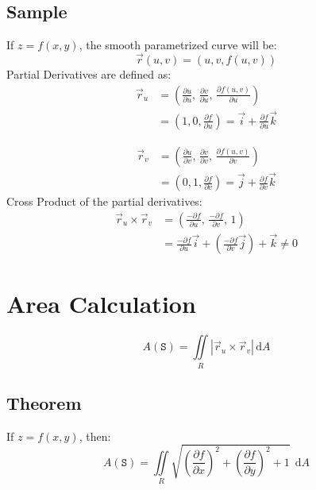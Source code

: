 \documentclass[12pt, fleqn]{book}
\newcommand{\D}{\mathrm{d}}
\newcommand{\rutrv}{\vec{r}_u \times \vec{r}_v\right}
\newcommand{\xy}{(x, y)}
\newcommand{\uv}{(u, v)}
\newcommand{\rond}[2]{\frac{\partial #1}{\partial #2}}
\begin{document}
		\subsection{Sample}
			If $z = f\xy$, the smooth parametrized curve will be:
				\begin{equation}
					\vec{r}\uv = (u, v, f\uv)
				\end{equation}
		 	Partial Derivatives are defined as:
			 	\begin{equation}
				 	\begin{split}
				 		\vec{r}_u 
				 		& = (
				 			\rond{u}{u}, \,
				 			\rond{v}{u}, \,
				 			\rond{f\uv}{u}
				 		) \\
				 		& = (1, 0, \rond{f}{u})
			              = \vec{i} + \rond{f}{u} \vec{k}
				 	\end{split}
			 	\end{equation}
		 	
			 	\begin{equation}
				 	\begin{split}
						\vec{r}_v 
						& = (
								\rond{u}{v}, \,
								\rond{v}{v}, \,
								\rond{f\uv}{v}
							) \\
						& = (0, 1, \rond{f}{v})
						  = \vec{j} + \rond{f}{v} \vec{k}
					\end{split}
				\end{equation}
	 	    Cross Product of the partial derivatives:
	 	    \begin{equation}
				\begin{split}
					\vec{r}_u \times \vec{r}_v 
					& = (
						\frac{- \partial f}{\partial u}, \, 
						\frac{- \partial f}{\partial v}, \, 
						1
					) \\
					& = \frac{- \partial f}{\partial u} \vec{i} +
					    (\frac{- \partial f}{\partial v} \vec{j}) + 
					    \vec{k} \neq 0
				\end{split}
			\end{equation}
		
	\section{Area Calculation}
		\begin{equation}
			A(\mathtt{S}) = \iint\limits_R \left|\rutrv| \, \D A
		\end{equation}
		\subsection{Theorem}
			If $z = f\xy$, then:
			\begin{equation}
				A(\mathtt{S}) = 
				  \iint\limits_R 
				  \sqrt{
				  	(\rond{f}{x})^2 + 
				  	(\rond{f}{y})^2 + 
				  	1
			  	} 
				  \ \ \D A
			\end{equation}
\end{document}
